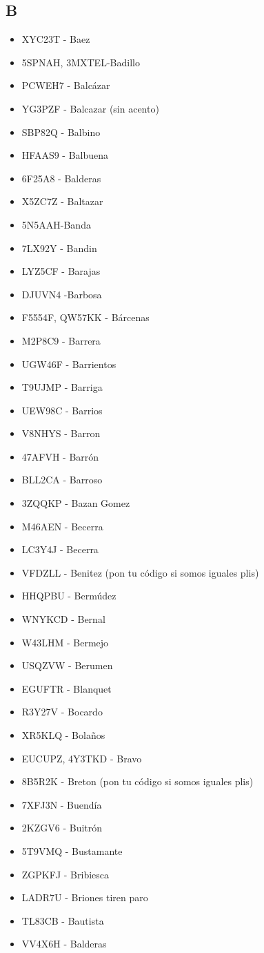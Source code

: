 \subsection*{B}
\begin{itemize}[leftmargin=*,nosep]
\item XYC23T - Baez
\item 5SPNAH, 3MXTEL-Badillo
\item PCWEH7 - Balcázar
\item YG3PZF - Balcazar (sin acento)
\item SBP82Q  -  Balbino
\item HFAAS9  -  Balbuena
\item 6F25A8  -  Balderas
\item X5ZC7Z - Baltazar
\item 5N5AAH-Banda
\item 7LX92Y - Bandin
\item LYZ5CF - Barajas
\item DJUVN4 -Barbosa
\item F5554F, QW57KK - Bárcenas
\item M2P8C9 -    Barrera
\item UGW46F - Barrientos
\item T9UJMP - Barriga
\item UEW98C - Barrios
\item V8NHYS  -  Barron
\item 47AFVH  -  Barrón
\item BLL2CA -  Barroso
\item 3ZQQKP  -  Bazan Gomez
\item M46AEN - Becerra
\item LC3Y4J - Becerra
\item VFDZLL  -  Benitez (pon tu código si somos iguales plis)
\item HHQPBU - Bermúdez
\item WNYKCD - Bernal
\item W43LHM - Bermejo
\item USQZVW -  Berumen
\item EGUFTR - Blanquet
\item R3Y27V - Bocardo
\item XR5KLQ  -  Bolaños
\item EUCUPZ, 4Y3TKD - Bravo
\item 8B5R2K - Breton (pon tu código si somos iguales plis)
\item 7XFJ3N  -  Buendía
\item 2KZGV6 - Buitrón
\item 5T9VMQ  -  Bustamante
\item ZGPKFJ - Bribiesca
\item LADR7U - Briones tiren paro
\item TL83CB - Bautista
\item VV4X6H - Balderas
\end{itemize}

